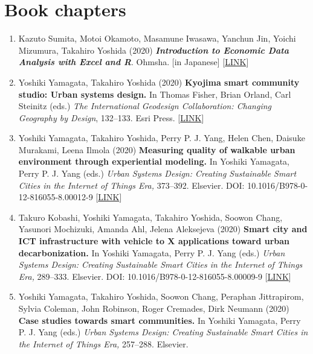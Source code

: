 \documentclass[]{book}
\providecommand{\tightlist}{%
  \setlength{\itemsep}{0pt}\setlength{\parskip}{0pt}}
\begin{document}
\hypertarget{book-chapters}{%
\section*{Book chapters}\label{book-chapters}}

\begin{enumerate}
\def\labelenumi{\arabic{enumi}.}
\tightlist
\item
  Kazuto Sumita, Motoi Okamoto, Masamune Iwasawa, Yanchun Jin, Yoichi Mizumura, Takahiro Yoshida (2020)
  \textbf{\emph{Introduction to Economic Data Analysis with Excel and R}}. Ohmsha.
  {[}in Japanese{]} {[}\href{https://www.ohmsha.co.jp/book/9784274225628/}{LINK}{]}
\item
  Yoshiki Yamagata, Takahiro Yoshida (2020)
  \textbf{Kyojima smart community studio: Urban systems design.}
  In Thomas Fisher, Brian Orland, Carl Steinitz (eds.)
  \emph{The International Geodesign Collaboration: Changing Geography by Design}, 132--133. Esri Press.
  {[}\href{https://esripress.esri.com/display/index.cfm?fuseaction=display\&websiteID=388\&moduleID=0}{LINK}{]}
\item
  Yoshiki Yamagata, Takahiro Yoshida, Perry P. J. Yang, Helen Chen, Daisuke Murakami, Leena Ilmola (2020)
  \textbf{Measuring quality of walkable urban environment through experiential modeling.}
  In Yoshiki Yamagata, Perry P. J. Yang (eds.)
  \emph{Urban Systems Design: Creating Sustainable Smart Cities in the Internet of Things Era,} 373--392. Elsevier.
  DOI: 10.1016/B978-0-12-816055-8.00012-9 {[}\href{https://www.elsevier.com/books/urban-systems-design/yamagata/978-0-12-816055-8}{LINK}{]}
\item
  Takuro Kobashi, Yoshiki Yamagata, Takahiro Yoshida, Soowon Chang, Yasunori Mochizuki, Amanda Ahl, Jelena Aleksejeva (2020)
  \textbf{Smart city and ICT infrastructure with vehicle to X applications toward urban decarbonization.}
  In Yoshiki Yamagata, Perry P. J. Yang (eds.)
  \emph{Urban Systems Design: Creating Sustainable Smart Cities in the Internet of Things Era,} 289--333. Elsevier.
  DOI: 10.1016/B978-0-12-816055-8.00009-9 {[}\href{https://www.elsevier.com/books/urban-systems-design/yamagata/978-0-12-816055-8}{LINK}{]}
\item
  Yoshiki Yamagata, Takahiro Yoshida, Soowon Chang, Peraphan Jittrapirom, Sylvia Coleman, John Robinson, Roger Cremades, Dirk Neumann (2020)
  \textbf{Case studies towards smart communities.}
  In Yoshiki Yamagata, Perry P. J. Yang (eds.)
  \emph{Urban Systems Design: Creating Sustainable Smart Cities in the Internet of Things Era,} 257--288. Elsevier.

\end{enumerate}
\end{document}
